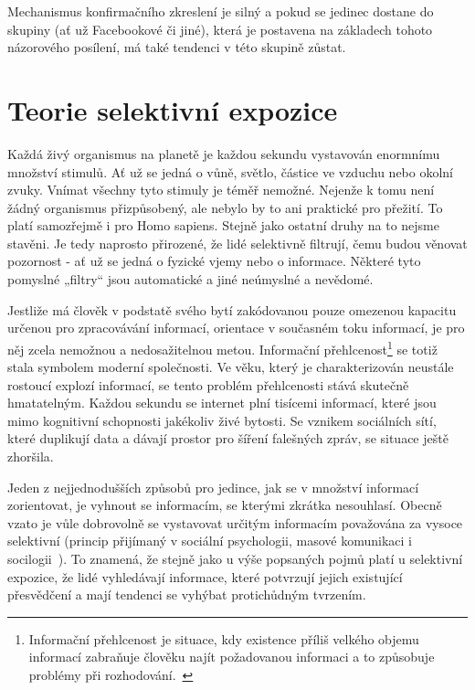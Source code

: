     Mechanismus konfirmačního zkreslení je silný a pokud se jedinec dostane do skupiny (ať už Facebookové či jiné), která je postavena na základech tohoto názorového posílení, má také tendenci v této skupině zůstat.~\citep{muller2020filter}
    
    \setlength\parskip{0mm}
\section{Teorie selektivní expozice}
\label{sec:selektivni-expozice}
    Každá živý organismus na planetě je každou sekundu vystavován enormnímu množství stimulů. Ať už se jedná o vůně, světlo, částice ve vzduchu nebo okolní zvuky. Vnímat všechny tyto stimuly je téměř nemožné. Nejenže k tomu není žádný organismus přizpůsobený, ale nebylo by to ani praktické pro přežití. To platí samozřejmě i pro Homo sapiens. Stejně jako ostatní druhy na to nejsme stavěni. Je tedy naprosto přirozené, že lidé selektivně filtrují, čemu budou věnovat pozornost - ať už se jedná o fyzické vjemy nebo o informace. Některé tyto pomyslné „filtry“ jsou automatické a jiné neúmyslné a nevědomé.~\citep{zillmann2013selective}
    
    Jestliže má člověk v podstatě svého bytí zakódovanou pouze omezenou kapacitu určenou pro zpracovávání informací, orientace v současném toku informací, je pro něj zcela nemožnou a nedosažitelnou metou. Informační přehlcenost\footnote{Informační přehlcenost je situace, kdy existence příliš velkého objemu informací zabraňuje člověku najít požadovanou informaci a to způsobuje problémy při rozhodování.~\citep{Renjith}} se totiž stala symbolem moderní společnosti. Ve věku, který je charakterizován neustále rostoucí explozí informací, se tento problém přehlcenosti stává skutečně hmatatelným. Každou sekundu se internet plní tisícemi informací, které jsou mimo kognitivní schopnosti jakékoliv živé bytosti. Se vznikem sociálních sítí, které duplikují data a dávají prostor pro šíření falešných zpráv, se situace ještě zhoršila.~\citep{Renjith}
    
    Jeden z nejjednodušších způsobů pro jedince, jak se v množství informací zorientovat, je vyhnout se informacím, se kterými zkrátka nesouhlasí. Obecně vzato je vůle dobrovolně se vystavovat určitým informacím považována za vysoce selektivní (princip přijímaný v sociální psychologii, masové komunikaci i socilogii~\citep{FreedmanSears}). To znamená, že stejně jako u výše popsaných pojmů platí u selektivní expozice, že lidé vyhledávají informace, které potvrzují jejich existující přesvědčení a mají tendenci se vyhýbat protichůdným tvrzením.~\citep{Berkowitz}
    
